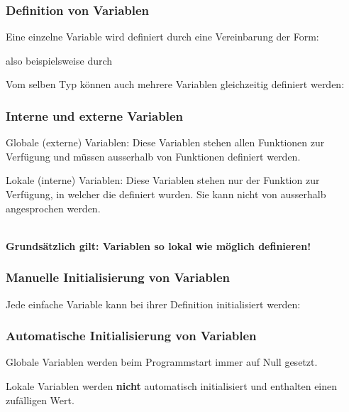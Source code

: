	\begin{minipage}[t]{9 cm}
		\subsubsection{Definition von Variablen }
			Eine einzelne Variable wird definiert durch eine Vereinbarung der Form:
			
			also beispielsweise durch
			
			Vom selben Typ können auch mehrere Variablen gleichzeitig definiert werden:
			
	\end{minipage}
	\hspace*{0.5cm}
	\begin{minipage}[t]{9 cm}
		\subsubsection{Interne und externe Variablen }
			\begin{compactitem}
				\item Globale (externe) Variablen: Diese Variablen stehen allen Funktionen zur Verfügung und müssen ausserhalb von Funktionen definiert werden.
				\item Lokale (interne) Variablen: Diese Variablen stehen nur der Funktion zur Verfügung, in welcher die definiert wurden. Sie kann nicht von ausserhalb angesprochen werden.
			\end{compactitem}
			
			\ \\
			\textbf{Grundsätzlich gilt: Variablen so lokal wie möglich definieren!}
	\end{minipage}	
	
	\begin{minipage}[t]{9 cm}
		\subsubsection{Manuelle Initialisierung von Variablen }
			Jede einfache Variable kann bei ihrer Definition initialisiert werden:
			
	\end{minipage}
	\hspace*{0.5cm}
	\begin{minipage}[t]{9 cm}	
		\subsubsection{Automatische Initialisierung von Variablen }
			\begin{compactitem}
				\item Globale Variablen werden beim Programmstart immer auf Null gesetzt.
				\item Lokale Variablen werden \textbf{nicht} automatisch initialisiert und enthalten einen zufälligen Wert.
			\end{compactitem}					
	\end{minipage}		
	
